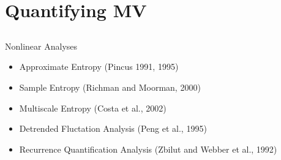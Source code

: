 \section{Quantifying MV}




%
%
%
%

\subsection{}
{
\begin{frame}{Nonlinear Analyses}

\begin{itemize}
	\item Approximate Entropy (Pincus 1991, 1995)
	\item Sample Entropy (Richman and Moorman, 2000)
	\item Multiscale Entropy (Costa et al., 2002)
	\item Detrended Fluctation Analysis (Peng et al., 1995)
	\item Recurrence Quantification Analysis (Zbilut and Webber et al., 1992)
\end{itemize}


\end{frame}
}






